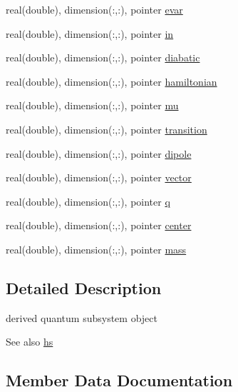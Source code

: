 \begin{DoxyCompactItemize}
\item 
real(double), dimension(\+:,\+:), pointer \hyperlink{structdipoles__class_1_1dipoles_a0ad9c6f181edabc7af6eb360edf07c63}{evar}
\item 
real(double), dimension(\+:,\+:), pointer \hyperlink{structdipoles__class_1_1dipoles_a72b5bb78d64f180123c27dd5cd9434fc}{in}
\item 
real(double), dimension(\+:,\+:), pointer \hyperlink{structdipoles__class_1_1dipoles_acb589f5c8c60337abc5da4b268ccd0e8}{diabatic}
\item 
real(double), dimension(\+:,\+:), pointer \hyperlink{structdipoles__class_1_1dipoles_adea6f688f172d2fc865a882326ab36e9}{hamiltonian}
\item 
real(double), dimension(\+:,\+:), pointer \hyperlink{structdipoles__class_1_1dipoles_a0112209fe626d20d6ef77facd97b5ad8}{mu}
\item 
real(double), dimension(\+:,\+:), pointer \hyperlink{structdipoles__class_1_1dipoles_a89dfcd300426c525f92d7ca048dfbfdb}{transition}
\item 
real(double), dimension(\+:,\+:), pointer \hyperlink{structdipoles__class_1_1dipoles_a6786ac3377ec10046d5a7bacf0b14da1}{dipole}
\item 
real(double), dimension(\+:,\+:), pointer \hyperlink{structdipoles__class_1_1dipoles_a658a483ea027a653fefdd02718773ea6}{vector}
\item 
real(double), dimension(\+:,\+:), pointer \hyperlink{structdipoles__class_1_1dipoles_ab97f9dcc84c8fafe029986f103d99630}{q}
\item 
real(double), dimension(\+:,\+:), pointer \hyperlink{structdipoles__class_1_1dipoles_ab7c31b6af230c4668d6fd24b359836bf}{center}
\item 
real(double), dimension(\+:,\+:), pointer \hyperlink{structdipoles__class_1_1dipoles_af9a15beeff0e1c4f47e28fc136fd9ea8}{mass}
\end{DoxyCompactItemize}


\subsection{Detailed Description}
derived quantum subsystem object 

\begin{DoxySeeAlso}{See also}
\hyperlink{structdipoles__class_1_1dipoles_afa2264f1ca48581328e2ab0e1745db4a}{hs} 
\end{DoxySeeAlso}


\subsection{Member Data Documentation}
\mbox{\label{structdipoles__class_1_1dipoles_a7009b45719053d38b8b082f1505127cd}} 
